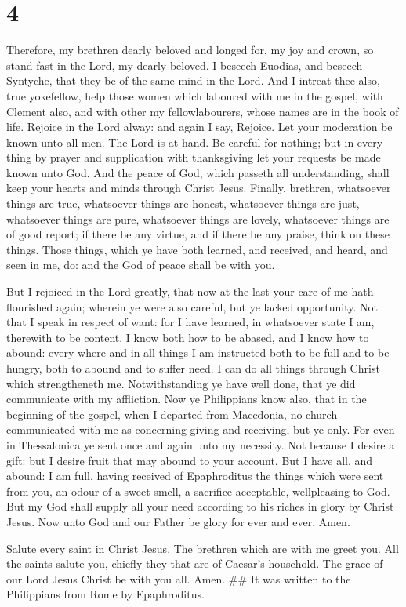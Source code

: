 \hypertarget{section-3}{%
\section{4}\label{section-3}}

 Therefore, my brethren dearly beloved and longed for, my
joy and crown, so stand fast in the Lord, my dearly beloved.
 I beseech Euodias, and beseech Syntyche, that they be of
the same mind in the Lord.  And I intreat thee also, true
yokefellow, help those women which laboured with me in the gospel, with
Clement also, and with other my fellowlabourers, whose names are in the
book of life.  Rejoice in the Lord alway: and again I say,
Rejoice.  Let your moderation be known unto all men. The
Lord is at hand.  Be careful for nothing; but in every thing
by prayer and supplication with thanksgiving let your requests be made
known unto God.  And the peace of God, which passeth all
understanding, shall keep your hearts and minds through Christ Jesus.
 Finally, brethren, whatsoever things are true, whatsoever
things are honest, whatsoever things are just, whatsoever things are
pure, whatsoever things are lovely, whatsoever things are of good
report; if there be any virtue, and if there be any praise, think on
these things.  Those things, which ye have both learned, and
received, and heard, and seen in me, do: and the God of peace shall be
with you.

 But I rejoiced in the Lord greatly, that now at the last
your care of me hath flourished again; wherein ye were also careful, but
ye lacked opportunity.  Not that I speak in respect of
want: for I have learned, in whatsoever state I am, therewith to be
content.  I know both how to be abased, and I know how to
abound: every where and in all things I am instructed both to be full
and to be hungry, both to abound and to suffer need.  I can
do all things through Christ which strengtheneth me. 
Notwithstanding ye have well done, that ye did communicate with my
affliction.  Now ye Philippians know also, that in the
beginning of the gospel, when I departed from Macedonia, no church
communicated with me as concerning giving and receiving, but ye only.
 For even in Thessalonica ye sent once and again unto my
necessity.  Not because I desire a gift: but I desire fruit
that may abound to your account.  But I have all, and
abound: I am full, having received of Epaphroditus the things which were
sent from you, an odour of a sweet smell, a sacrifice acceptable,
wellpleasing to God.  But my God shall supply all your need
according to his riches in glory by Christ Jesus.  Now unto
God and our Father be glory for ever and ever. Amen.

 Salute every saint in Christ Jesus. The brethren which are
with me greet you.  All the saints salute you, chiefly they
that are of Caesar's household.  The grace of our Lord
Jesus Christ be with you all. Amen. \#\# It was written to the
Philippians from Rome by Epaphroditus.
